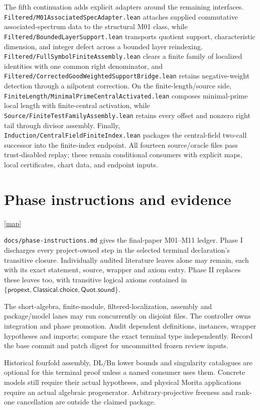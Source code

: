 \documentclass[10pt,a4paper]{article}
\newcommand{\backmap}{\hfill\hyperlink{proofmap}{[map]}}
\newcommand{\lean}[1]{\nolinkurl{#1}}
\begin{document}
The fifth continuation adds explicit adapters around the remaining interfaces.
\lean{Filtered/M01AssociatedSpecAdapter.lean} attaches supplied commutative
associated-spectrum data to the structural M01 class, while
\lean{Filtered/BoundedLayerSupport.lean} transports quotient support,
characteristic dimension, and integer defect across a bounded layer
reindexing. \lean{Filtered/FullSymbolFiniteAssembly.lean} clears a finite
family of localized identities with one common right denominator, and
\lean{Filtered/CorrectedGoodWeightedSupportBridge.lean} retains negative-weight
detection through a nilpotent correction. On the finite-length/source side,
\lean{FiniteLength/MinimalPrimeCentralActivated.lean} composes minimal-prime
local length with finite-central activation, while
\lean{Source/FiniteTestFamilyAssembly.lean} retains every offset and nonzero
right tail through divisor assembly. Finally,
\lean{Induction/CentralFieldFiniteIndex.lean} packages the central-field
two-call successor into the finite-index endpoint. All fourteen source/oracle
files pass trust-disabled replay; these remain conditional consumers with
explicit maps, local certificates, chart data, and endpoint inputs.

\section{Phase instructions and evidence}\label{sec:phases}\backmap

\lean{docs/phase-instructions.md} gives the final-paper M01--M11 ledger.
Phase I discharges every project-owned step in the selected terminal
declaration's transitive closure. Individually audited literature leaves
alone may remain, each with its exact statement, source, wrapper and axiom
entry. Phase II replaces these leaves too, with transitive logical axioms
contained in \(\{\mathsf{propext},\mathsf{Classical.choice},\mathsf{Quot.sound}\}\).

The short-algebra, finite-module, filtered-localization, assembly and
package/model lanes may run concurrently on disjoint files. The controller
owns integration and phase promotion. Audit dependent definitions, instances,
wrapper hypotheses and imports; compare the exact terminal type independently.
Record the base commit and patch digest for uncommitted frozen review inputs.

Historical fourfold assembly, DL/Bn lower bounds and singularity catalogues
are optional for this terminal proof unless a named consumer uses them.
Concrete models still require their actual hypotheses, and physical Morita
applications require an actual algebraic progenerator. Arbitrary-projective
freeness and rank-one cancellation are outside the claimed package.
\end{document}
